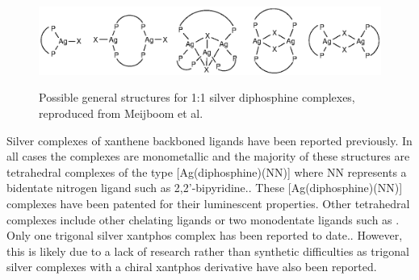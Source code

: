 \begin{figure}[h] 
\begin{center}
\vspace{0.5cm}
\includegraphics[scale=0.8]{../Figures/Possiblesilverstructures.eps}
\caption[Possible general structures for 1:1 silver diphosphine complexes]{Possible general structures for 1:1 silver diphosphine complexes, reproduced from Meijboom et al.\cite{Meijboom2009}}
\vspace{0.2cm}
\label{Silverstructures}
\end{center}
\end{figure}
\vspace{0.2cm}


Silver complexes of xanthene backboned ligands have been reported previously.\cite{Malaise2006, Balakrishna2008}  In all cases the complexes are monometallic and the majority of these structures are tetrahedral complexes of the type [Ag(diphosphine)(NN)] where NN represents a bidentate nitrogen ligand such as 2,2'-bipyridine..  These [Ag(diphosphine)(NN)] complexes have been patented for their luminescent properties.  Other tetrahedral complexes include other chelating ligands  or two monodentate ligands such as .  Only one trigonal silver xantphos complex  has been reported to date.\cite{Kaltzoglou2007}.  However, this is likely due to a lack of research rather than synthetic difficulties as trigonal silver complexes with a chiral xantphos derivative have also been reported.\cite{Malaise2006}


